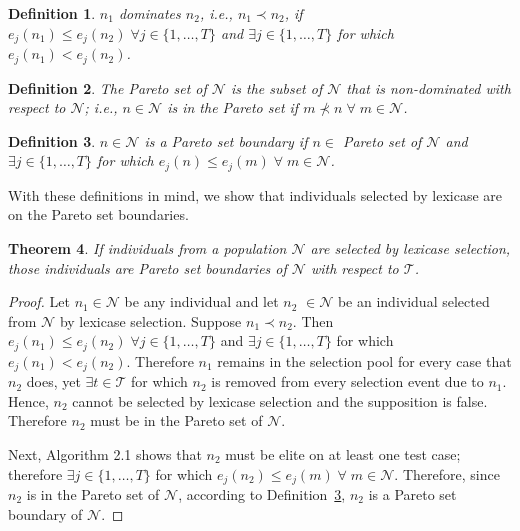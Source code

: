 \documentclass[twoside]{article}
\newtheorem{lex}{Theorem}[section]
\newtheorem{defn}[lex]{Definition}
\begin{document}
\begin{defn}\label{def:dom}
$n_1$ {\it dominates} $n_2$, i.e., ${n_1} \prec {n_2}$, if $e_j(n_1) \leq e_j(n_2) \;
\forall j  \in \{1,\dots,T\}$ and $\exists j \in \{1,\dots,T\}$ for which $e_j(n_1) < e_j(n_2)$. \bigskip
\end{defn}

\begin{defn}\label{def:pset}
The {\it Pareto set} of $\mathcal{N}$ is the subset of $\mathcal{N}$ that is non-dominated with respect to $\mathcal{N}$; i.e., $n \in \mathcal{N}$ is in the Pareto set if $m \nprec n \; \forall \; m \in \mathcal{N}$. 
\end{defn}

\begin{defn}\label{def:boundary}
$n \in \mathcal{N}$ is a {\it Pareto set boundary} if $n \in$ Pareto set of $\mathcal{N}$ and $\exists j \in \{1,\dots,T\}$ for which $e_j(n) \leq e_j(m) \; \forall \; m \in \mathcal{N}$. 
\end{defn}

With these definitions in mind, we show that individuals selected by lexicase are on the Pareto set boundaries. 

\begin{lex}\label{thm:lex}
If individuals from a population $\mathcal{N}$ are selected by lexicase selection, those individuals are Pareto set boundaries of $\mathcal{N}$ with respect to $\mathcal{T}$. 
\end{lex}

\begin{proof}
Let $n_1 \in \mathcal{N}$ be any individual and let $n_2$ $\in \mathcal{N}$ be an individual selected from $\mathcal{N}$ by lexicase selection. Suppose $n_1 \prec n_2$. Then $e_j(n_1) \leq e_j(n_2) \;
\forall j  \in \{1,\dots,T\}$ and $\exists j \in \{1,\dots,T\}$ for which $e_j(n_1) < e_j(n_2)$. Therefore $n_1$ remains in the selection pool for every case that $n_2$ does, yet $\exists t \in \mathcal{T}$ for which $n_2$ is removed from every selection event due to $n_1$. Hence, $n_2$ cannot be selected by lexicase selection and the supposition is false. Therefore $n_2$ must be in the Pareto set of $\mathcal{N}$. 

Next, Algorithm 2.1 shows that $n_2$ must be elite on at least one test case; therefore $\exists j \in \{1,\dots,T\}$ for which $e_j(n_2) \leq e_j(m) \; \forall \; m \in \mathcal{N}$. Therefore, since $n_2$ is in the Pareto set of $\mathcal{N}$, according to Definition~\ref{def:boundary}, $n_2$ is a Pareto set boundary of $\mathcal{N}$.  
\end{proof}
\bigskip
\end{document}
